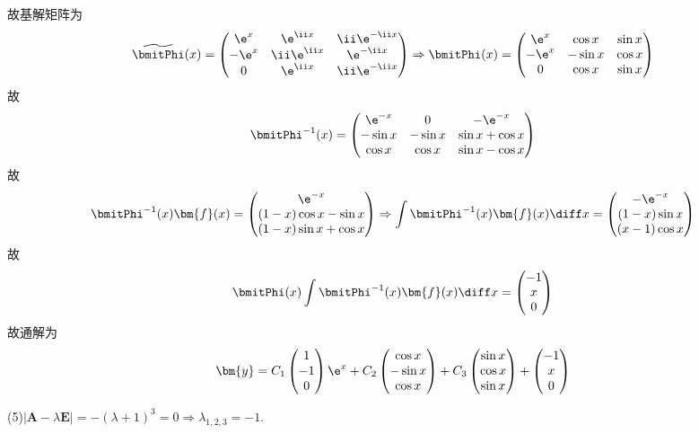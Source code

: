 \begin{solve}
故基解矩阵为
\[\widetilde{\bmitPhi}(x)=\begin{pmatrix}\e^x&\e^{\ii x}&\ii\e^{-\ii x}\\-\e^x&\ii\e^{\ii x}&\e^{-\ii x}\\0&\e^{\ii x}&\ii\e^{-\ii x}\end{pmatrix}\Rightarrow\bmitPhi(x)=\begin{pmatrix}\e^x&\cos x&\sin x\\-\e^x&-\sin x&\cos x\\0&\cos x&\sin x\end{pmatrix}\]
故\[\bmitPhi^{-1}(x)=\begin{pmatrix}\e^{-x}&0&-\e^{-x}\\-\sin x&-\sin x&\sin x+\cos x\\\cos x&\cos x&\sin x-\cos x\end{pmatrix}\]
故\[\bmitPhi^{-1}(x)\bm{f}(x)=\begin{pmatrix}\e^{-x}\\(1-x)\cos x-\sin x\\(1-x)\sin x+\cos x\end{pmatrix}\Rightarrow\int\bmitPhi^{-1}(x)\bm{f}(x)\diff x=\begin{pmatrix}-\e^{-x}\\(1-x)\sin x\\(x-1)\cos x\end{pmatrix}\]
故\[\bmitPhi(x)\int\bmitPhi^{-1}(x)\bm{f}(x)\diff x=\begin{pmatrix}-1\\x\\0\end{pmatrix}\]
故通解为\[\bm{y}=C_1\begin{pmatrix}1\\-1\\0\end{pmatrix}\e^x+C_2\begin{pmatrix}\cos x\\-\sin x\\\cos x\end{pmatrix}+C_3\begin{pmatrix}\sin x\\\cos x\\\sin x\end{pmatrix}+\begin{pmatrix}-1\\x\\0\end{pmatrix}\]

(5)$|\bm{A}-\lambda\bm{E}|=-(\lambda+1)^3=0\Rightarrow\lambda_{1,2,3}=-1$.


\end{solve}
